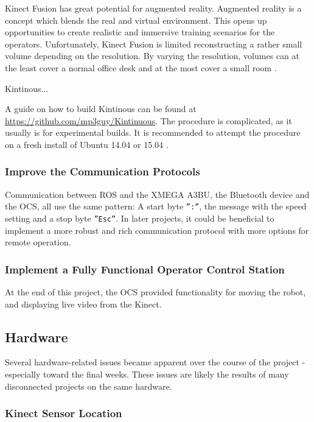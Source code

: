 Kinect Fusion has great potential for augmented reality. Augmented reality is a concept which blends the real and virtual environment. This opens up opportunities to create realistic and immersive training scenarios for the operators. Unfortunately, Kinect Fusion is limited reconstructing a rather small volume depending on the resolution. By varying the resolution, volumes can at the least cover a normal office desk and at the most cover a small room \cite{keylist}.  

Kintinous...

A guide on how to build Kintinous can be found  at \href{Github}{https://github.com/mp3guy/Kintinuous}. The procedure is complicated, as it usually is for experimental builds. It is recommended to attempt the procedure on a fresh install of Ubuntu 14.04 or 15.04 \cite{Kintinous}.

\subsubsection{Improve the Communication Protocols}

Communication between \ac{ROS} and the XMEGA A3BU, the Bluetooth device and the \ac{OCS}, all use the same pattern: A start byte \texttt{'':''}, the message with the speed setting and a stop byte \texttt{''Esc''}. In later projects, it could be beneficial to implement a more robust and rich communication protocol with more options for remote operation. 

\subsubsection{Implement a Fully Functional Operator Control Station}

At the end of this project, the \ac{OCS} provided functionality for moving the robot, and displaying live video from the Kinect. 

\subsection{Hardware}

Several hardware-related issues became apparent over the course of the project - especially toward the final weeks. These issues are likely the results of many disconnected projects on the same hardware.

\subsubsection{Kinect Sensor Location}

